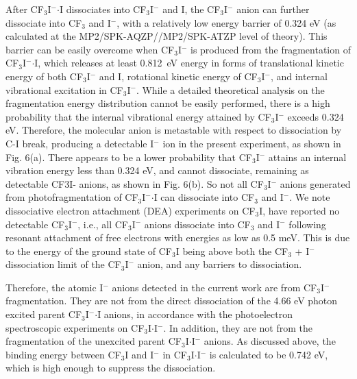 \documentclass[%
aip,
rsi,
 amsmath,amssymb,
reprint,%
]{revtex4-1}
\begin{document}
After CF$_3$I$^-$$\cdot$I dissociates into CF$_3$I$^-$ and I, the CF$_3$I$^-$ anion can further dissociate into CF$_3$ and I$^-$, with a relatively low energy barrier of 0.324 eV (as calculated at the MP2/SPK-AQZP//MP2/SPK-ATZP level of theory). This barrier can be easily overcome when CF$_3$I$^-$ is produced from the fragmentation of CF$_3$I$^-$$\cdot$I, which releases at least 0.812~eV energy in forms of translational kinetic energy of both CF$_3$I$^-$ and I, rotational kinetic energy of CF$_3$I$^-$, and internal vibrational excitation in CF$_3$I$^-$. While a detailed theoretical analysis on the fragmentation energy distribution cannot be easily performed, there is a high probability that the internal vibrational energy attained by CF$_3$I$^-$ exceeds 0.324 eV. Therefore, the molecular anion is metastable with respect to dissociation by C-I break, producing a detectable I$^-$ ion in the present experiment, as shown in Fig. 6(a). There appears to be a lower probability that CF$_3$I$^-$ attains an internal vibration energy less than 0.324 eV, and cannot dissociate, remaining as detectable CF3I- anions, as shown in Fig. 6(b). So not all CF$_3$I$^-$ anions generated from photofragmentation of CF$_3$I$^-$$\cdot$I can dissociate into CF$_3$ and I$^-$. We note dissociative electron attachment (DEA) experiments\cite{marienfeld_high_2006,heni_dissociative_1986} on CF$_3$I, have reported no detectable CF$_3$I$^-$, i.e., all CF$_3$I$^-$ anions dissociate into CF$_3$ and I$^-$ following resonant attachment of free electrons with energies as low as 0.5 meV. This is due to the energy of the ground state of CF$_3$I being above both the CF$_3$ + I$^-$ dissociation limit of the CF$_3$I$^-$ anion, and any barriers to dissociation. 

Therefore, the atomic I$^-$ anions detected in the current work are from CF$_3$I$^-$ fragmentation. They are not from the direct dissociation of the 4.66 eV photon excited parent CF$_3$I$^-$$\cdot$I anions, in accordance with the photoelectron spectroscopic experiments on CF$_3$I$\cdot$I$^-$\cite{mensa-bonsu_photoelectron_2019}. In addition, they are not from the fragmentation of the unexcited parent CF$_3$I$\cdot$I$^-$ anions. As discussed above, the binding energy between CF$_3$I and I$^-$ in CF$_3$I$\cdot$I$^-$ is calculated to be 0.742 eV, which is high enough to suppress the dissociation. 

\end{document}
